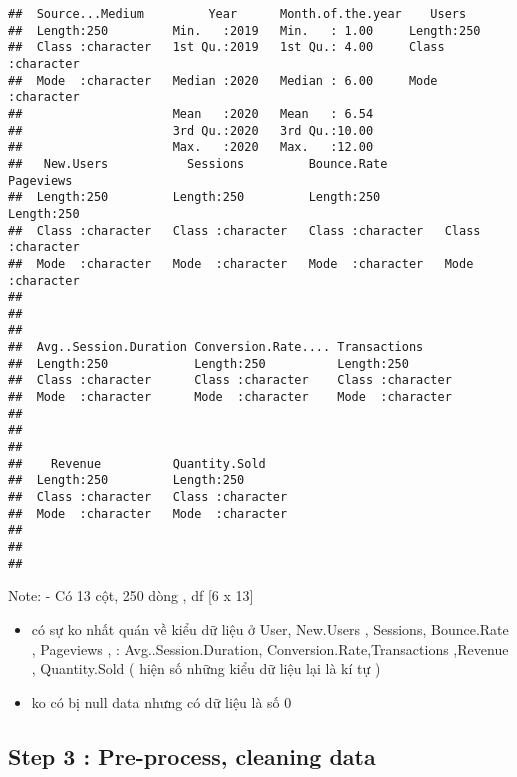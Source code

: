 \documentclass[
]{article}
\begin{document}
\begin{verbatim}
##  Source...Medium         Year      Month.of.the.year    Users          
##  Length:250         Min.   :2019   Min.   : 1.00     Length:250        
##  Class :character   1st Qu.:2019   1st Qu.: 4.00     Class :character  
##  Mode  :character   Median :2020   Median : 6.00     Mode  :character  
##                     Mean   :2020   Mean   : 6.54                       
##                     3rd Qu.:2020   3rd Qu.:10.00                       
##                     Max.   :2020   Max.   :12.00                       
##   New.Users           Sessions         Bounce.Rate         Pageviews        
##  Length:250         Length:250         Length:250         Length:250        
##  Class :character   Class :character   Class :character   Class :character  
##  Mode  :character   Mode  :character   Mode  :character   Mode  :character  
##                                                                             
##                                                                             
##                                                                             
##  Avg..Session.Duration Conversion.Rate.... Transactions      
##  Length:250            Length:250          Length:250        
##  Class :character      Class :character    Class :character  
##  Mode  :character      Mode  :character    Mode  :character  
##                                                              
##                                                              
##                                                              
##    Revenue          Quantity.Sold     
##  Length:250         Length:250        
##  Class :character   Class :character  
##  Mode  :character   Mode  :character  
##                                       
##                                       
## 
\end{verbatim}

Note: - Có 13 cột, 250 dòng , df {[}6 x 13{]}

\begin{itemize}
\item
  có sự ko nhất quán về kiểu dữ liệu ở User, New.Users , Sessions,
  Bounce.Rate , Pageviews , : Avg..Session.Duration,
  Conversion.Rate,Transactions ,Revenue , Quantity.Sold ( hiện số những
  kiểu dữ liệu lại là kí tự )
\item
  ko có bị null data nhưng có dữ liệu là số 0
\end{itemize}

\subsection{Step 3 : Pre-process, cleaning
data}\label{step-3-pre-process-cleaning-data}
\end{document}
